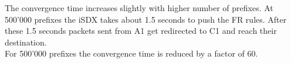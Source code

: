 The convergence time increases slightly with higher number of prefixes. At 500'000 prefixes the iSDX takes about 1.5 seconds to push the FR rules. After these 1.5 seconds packets sent from A1 get redirected to C1 and reach their destination. \\
For 500'000 prefixes the convergence time is reduced by a factor of 60.

\newpage